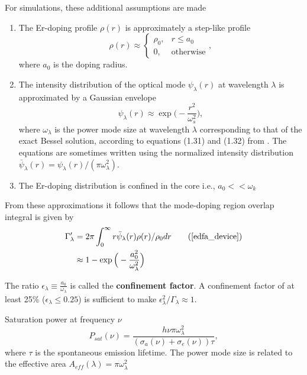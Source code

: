 \documentclass[a4paper]{article}
\begin{document}
For simulations, these additional assumptions are made
\begin{enumerate}
	\item The Er-doping profile $\rho(r)$ is approximately a step-like profile
	\begin{equation}
		\rho(r) \approx \begin{cases}
		\rho_0,  & r \leq a_0\\
		0, & \text{otherwise}
		\end{cases},
	\end{equation}
	where $a_0$ is the doping radius.
	\item The intensity distribution of the optical mode $\psi_\lambda(r)$ at wavelength $\lambda$ is approximated by a Gaussian envelope \cite[eq. (1.80)]{principles}
	\begin{equation}
		\psi_\lambda(r) \approx \exp\Big(-\frac{r^2}{\omega_s^2}\Big), 
	\end{equation}
	where $\omega_\lambda$ is the power mode size at wavelength $\lambda$ corresponding to that of the exact Bessel solution, according to equations (1.31) and (1.32) from \cite{principles}. 
	The equations are sometimes written using the normalized intensity distribution  $\bar{\psi}_\lambda(r)  = \psi_\lambda(r)/(\pi\omega_\lambda^2)$.
	\item The Er-doping distribution is confined in the core i.e., $a_0 << \omega_k$
\end{enumerate}

From these approximations it follows that the mode-doping region overlap integral is given by
\begin{align} 
	\Gamma_\lambda^\prime &= 2\pi\int_0^{\infty} r\bar{\psi}_\lambda(r)\rho(r)/\rho_0dr \tag{\cite[eq. (1.220)]{edfa_device}} \\
	&\approx 1 - \exp\Big(-\frac{a_0^2}{\omega_\lambda^2}\Big)
\end{align}

The ratio $\epsilon_\lambda\equiv \frac{a_0}{\omega_\lambda}$ is called the \textbf{confinement factor}. A confinement factor of at least 25\% ($\epsilon_\lambda \leq 0.25$) is sufficient to make $\epsilon^2_\lambda/\Gamma_\lambda\approx 1$. 

Saturation power at frequency $\nu$
\begin{equation}
	P_{sat}(\nu) = \frac{h\nu\pi\omega_\lambda^2}{(\sigma_a(\nu) + \sigma_e(\nu))\tau},
\end{equation}
where $\tau$ is the spontaneous emission lifetime. The power mode size is related to the effective area $A_{eff}(\lambda) = \pi\omega^2_\lambda$
\end{document}
